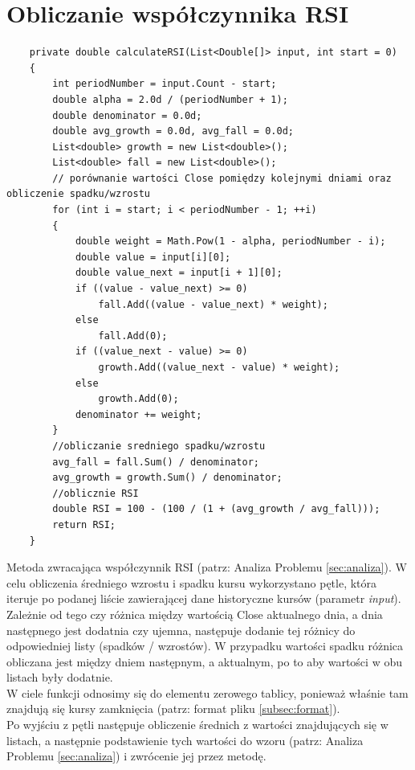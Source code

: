\documentclass[a4paper]{article}
\begin{document}
	\section{Obliczanie współczynnika RSI}
	\begin{lstlisting}
	private double calculateRSI(List<Double[]> input, int start = 0)
	{
		int periodNumber = input.Count - start;
		double alpha = 2.0d / (periodNumber + 1);
		double denominator = 0.0d;
		double avg_growth = 0.0d, avg_fall = 0.0d;
		List<double> growth = new List<double>();
		List<double> fall = new List<double>();
		// porównanie wartości Close pomiędzy kolejnymi dniami oraz obliczenie spadku/wzrostu
		for (int i = start; i < periodNumber - 1; ++i)
		{
			double weight = Math.Pow(1 - alpha, periodNumber - i);
			double value = input[i][0];
			double value_next = input[i + 1][0];
			if ((value - value_next) >= 0)
				fall.Add((value - value_next) * weight);
			else
				fall.Add(0);
			if ((value_next - value) >= 0)
				growth.Add((value_next - value) * weight);
			else
				growth.Add(0);
			denominator += weight;
		}
		//obliczanie sredniego spadku/wzrostu
		avg_fall = fall.Sum() / denominator;
		avg_growth = growth.Sum() / denominator;
		//oblicznie RSI
		double RSI = 100 - (100 / (1 + (avg_growth / avg_fall)));
		return RSI;
	}
	\end{lstlisting}
	Metoda zwracająca współczynnik RSI (patrz: Analiza Problemu \ref{sec:analiza}). W celu obliczenia średniego wzrostu i spadku kursu wykorzystano pętle, która iteruje po podanej liście zawierającej dane historyczne kursów (parametr \emph{input}). Zależnie od tego czy różnica między wartością Close aktualnego dnia, a dnia następnego jest dodatnia czy ujemna, następuje dodanie tej różnicy do odpowiedniej listy (spadków / wzrostów). W przypadku wartości spadku różnica obliczana jest między dniem następnym, a aktualnym, po to aby wartości w obu listach były dodatnie.\\
	W ciele funkcji odnosimy się do elementu zerowego tablicy, ponieważ właśnie tam znajdują się kursy zamknięcia (patrz: format pliku \ref{subsec:format}).\\
	Po wyjściu z pętli następuje obliczenie średnich z wartości znajdujących się w listach, a następnie podstawienie tych wartości do wzoru (patrz: Analiza Problemu \ref{sec:analiza}) i zwrócenie jej przez metodę.
	
\end{document}
